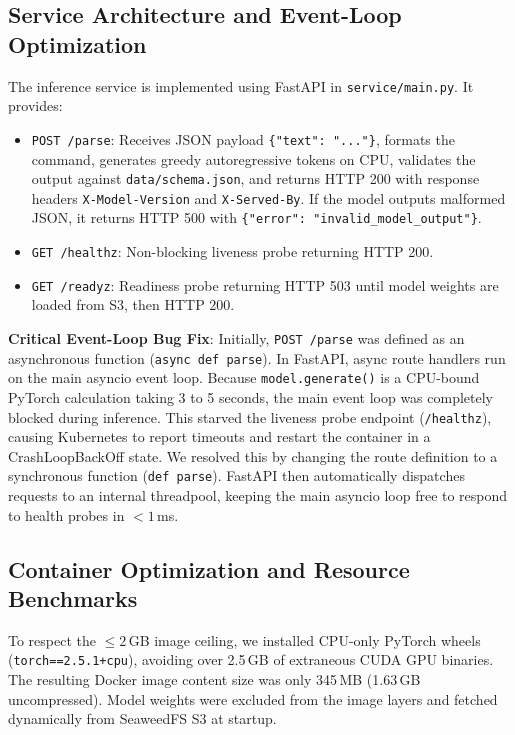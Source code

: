 \documentclass[10pt,a4paper]{article}
\begin{document}
\subsection{Service Architecture and Event-Loop Optimization}
The inference service is implemented using FastAPI in \texttt{service/main.py}. It provides:
\begin{itemize}
    \item \texttt{POST /parse}: Receives JSON payload \texttt{\{"text": "..."\}}, formats the command, generates greedy autoregressive tokens on CPU, validates the output against \texttt{data/schema.json}, and returns HTTP 200 with response headers \texttt{X-Model-Version} and \texttt{X-Served-By}. If the model outputs malformed JSON, it returns HTTP 500 with \texttt{\{"error": "invalid\_model\_output"\}}.
    \item \texttt{GET /healthz}: Non-blocking liveness probe returning HTTP 200.
    \item \texttt{GET /readyz}: Readiness probe returning HTTP 503 until model weights are loaded from S3, then HTTP 200.
\end{itemize}

\noindent\textbf{Critical Event-Loop Bug Fix}: Initially, \texttt{POST /parse} was defined as an asynchronous function (\texttt{async def parse}). In FastAPI, async route handlers run on the main asyncio event loop. Because \texttt{model.generate()} is a CPU-bound PyTorch calculation taking 3 to 5 seconds, the main event loop was completely blocked during inference. This starved the liveness probe endpoint (\texttt{/healthz}), causing Kubernetes to report timeouts and restart the container in a CrashLoopBackOff state. We resolved this by changing the route definition to a synchronous function (\texttt{def parse}). FastAPI then automatically dispatches requests to an internal threadpool, keeping the main asyncio loop free to respond to health probes in $<1$\,ms.

\subsection{Container Optimization and Resource Benchmarks}
To respect the $\le 2$\,GB image ceiling, we installed CPU-only PyTorch wheels (\texttt{torch==2.5.1+cpu}), avoiding over 2.5\,GB of extraneous CUDA GPU binaries. The resulting Docker image content size was only 345\,MB (1.63\,GB uncompressed). Model weights were excluded from the image layers and fetched dynamically from SeaweedFS S3 at startup.
\end{document}
